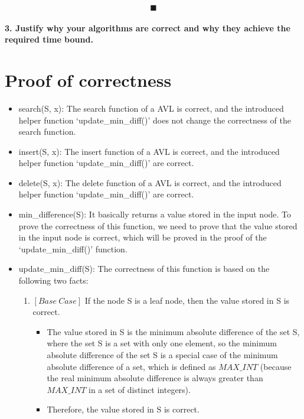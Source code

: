\documentclass{article}
\begin{document}
$$ \blacksquare $$
\newpage

\paragraph*{3. Justify why your algorithms are correct and why they achieve the required time bound.}

\section*{Proof of correctness}

\begin{itemize}
    \item search(S, x): The search function of a AVL is correct,
          and the introduced helper function `update\_min\_diff()' does not change the correctness of the search function.
    \item insert(S, x): The insert function of a AVL is correct,
          and the introduced helper function `update\_min\_diff()' are correct.
    \item delete(S, x): The delete function of a AVL is correct,
          and the introduced helper function `update\_min\_diff()' are correct.
    \item min\_difference(S): It basically returns a value stored in the input node.
          To prove the correctness of this function, we need to prove that the value stored in the input node is correct,
          which will be proved in the proof of the `update\_min\_diff()' function.
    \item update\_min\_diff(S): The correctness of this function is based on the following two facts:
          \begin{enumerate}
              \item $\left[Base\ Case\right]$ If the node S is a leaf node, then the value stored in S is correct.
                    \begin{itemize}
                        \item The value stored in S is the minimum absolute difference of the set S,
                              where the set S is a set with only one element, so the minimum absolute difference of the set S is
                              a special case of the minimum absolute difference of a set, which is defined as $MAX\_INT$
                              (because the real minimum absolute difference is always greater than $MAX\_INT$ in a set of distinct integers).
                        \item Therefore, the value stored in S is correct.
                    \end{itemize}


\end{enumerate}
\end{itemize}
\end{document}
